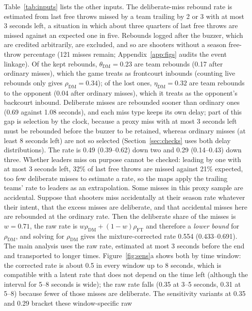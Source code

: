 \documentclass[article]{jdssv}
\begin{document}
Table~\ref{tab:inputs} lists the other inputs. The deliberate-miss rebound rate is estimated from last free
throws missed by a team trailing by 2 or 3 with at most 3 seconds left, a situation in which about three
quarters of last free throws are missed against an expected one in five. Rebounds logged after the buzzer, which
are credited arbitrarily, are excluded, and so are shooters without a season free-throw percentage (121 misses
remain; Appendix~\ref{app:figs} audits the event linkage). Of the kept rebounds, $\theta_{\mathrm{DM}}=0.23$ are team rebounds
(0.17 after ordinary misses), which the game treats as frontcourt inbounds (counting live rebounds only gives
$\rho_{\mathrm{DM}}=0.34$); of the lost ones, $\eta_{\mathrm{DM}}=0.32$ are team rebounds to the opponent (0.04 after
ordinary misses), which it treats as the opponent's backcourt inbound. Deliberate misses are rebounded sooner than
ordinary ones (0.69 against 1.08 seconds), and each miss type keeps its own delay; part of this gap is selection by
the clock, because a proxy miss with at most 3 seconds left must be rebounded before the buzzer to be retained,
whereas ordinary misses (at least 8 seconds left) are not so selected (Section~\ref{sec:checks} uses both delay
distributions). The rate is 0.49 (0.39--0.62) down two and 0.29 (0.14--0.43) down three. Whether leaders miss on purpose cannot be checked: leading by one with at most 3 seconds left, 32\% of last
free throws are missed against 21\% expected, too few deliberate misses to estimate a rate, so the maps apply the
trailing teams' rate to leaders as an extrapolation. Some misses in this proxy sample are
accidental. Suppose that shooters miss accidentally at their season rate whatever their intent, that the excess
misses are deliberate, and that accidental misses here are rebounded at the ordinary rate. Then the deliberate
share of the misses is $w=0.71$, the raw rate is $w\rho_{\mathrm{DM}}+(1-w)\rho_{\mathrm{FT}}$ and therefore a
\emph{lower bound} for $\rho_{\mathrm{DM}}$, and solving for $\rho_{\mathrm{DM}}$ gives the mixture-corrected rate
0.554 (0.433--0.691). The main analysis uses the raw rate, estimated at most 3 seconds before the end and
transported to longer times. Figure~\ref{fig:sens}a shows both by time window: the corrected rate is about 0.5 in
every window up to 8 seconds, which is compatible with a latent rate that does not depend on the time left
(although the interval for 5--8 seconds is wide); the raw rate falls (0.35 at 3--5 seconds, 0.31 at 5--8) because
fewer of those misses are deliberate. The sensitivity variants at 0.35 and 0.29 bracket these window-specific raw
\end{document}
